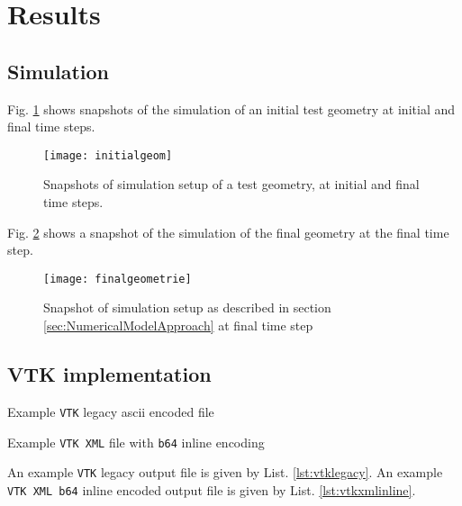\section{Results}
\label{sec:results}

\subsection{Simulation}

Fig. \ref{fig:initialgeometry} shows snapshots of the simulation of an initial test geometry at initial and final time steps. 

\begin{figure}[h!]
    \centering
    \texttt{[image: initialgeom]}
    \caption{Snapshots of simulation setup of a test geometry, at initial and final time steps.}
    \label{fig:initialgeometry}
\end{figure}

Fig. \ref{fig:finalgeometry} shows a snapshot of the simulation of the final geometry at the final time step. 

\begin{figure}[h!]
    \centering
    \texttt{[image: finalgeometrie]}
    \caption{Snapshot of simulation setup as described in section \ref{sec:NumericalModelApproach} at final time step}
    \label{fig:finalgeometry}
\end{figure}

\subsection{VTK implementation}

\begin{listing}[p!]
\caption{Example \texttt{VTK} legacy ascii encoded file}
\label{lst:vtklegacy}
\end{listing}

\begin{longlisting}
\caption{Example \texttt{VTK XML} file with \texttt{b64} inline encoding}
\label{lst:vtkxmlinline}
\end{longlisting}

\bigbreak
An example \texttt{VTK} legacy output file is given by List. \ref{lst:vtklegacy}. An example \texttt{VTK XML b64} inline encoded output file is given by List. \ref{lst:vtkxmlinline}.